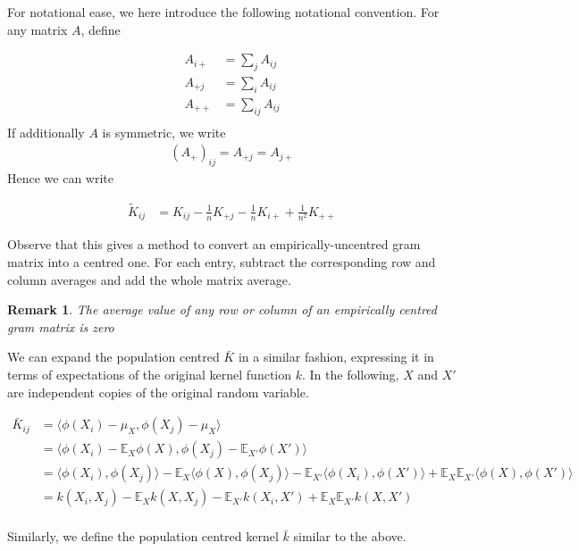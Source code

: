\documentclass[12pt]{article}
\newtheorem*{remark}{Remark}
\numberwithin{claim}{section}
\numberwithin{lemma}{section}
\numberwithin{theorem}{section}
\begin{document}
For notational ease, we here introduce the following notational convention. For any matrix $A$, define

\begin{align*}
A_{i+} & = \sum_j A_{ij} \\
A_{+j} & = \sum_i A_{ij} \\
A_{++} & = \sum_{ij} A_{ij} \\
\end{align*}
If additionally $A$ is symmetric, we write
\begin{align*}
(A_+)_{ij} = A_{+j} = A_{j+}
\end{align*}
Hence we can write

\begin{align*}
\tilde{K}_{ij}  & = K_{ij} -\frac{1}{n}  K_{+j} - \frac{1}{n}  K_{i+} + \frac{1}{n^2} K_{++}
\end{align*}

Observe that this gives a method to convert an empirically-uncentred gram matrix into a centred one. For each entry, subtract the corresponding row and column averages and add the whole matrix average.

\begin{remark}The average value of any row or column of an empirically centred gram matrix is zero
\end{remark}


We can expand the population centred $\bar{K}$ in a similar fashion, expressing it in terms of expectations of the original kernel function $k$. In the following, $X$ and $X'$ are independent copies of the original random variable.

\begin{align*}
\bar{K}_{ij}  & = \langle \phi(X_i) - \mu_X, \phi(X_j) - \mu_X \rangle \\
  & = \langle \phi(X_i) - \mathbb{E}_X\phi(X), \phi(X_j) -\mathbb{E}_{X'}\phi(X') \rangle \\
  & = \langle \phi(X_i), \phi(X_j) \rangle  -  \mathbb{E}_X \langle \phi(X), \phi(X_j) \rangle -  \mathbb{E}_{X'} \langle \phi(X_i) , \phi(X') \rangle +   \mathbb{E}_X \mathbb{E}_{X'} \langle \phi(X), \phi(X') \rangle \\
& = k(X_i,X_j)  -  \mathbb{E}_X k(X,X_j) -  \mathbb{E}_{X'} k(X_i,X') +   \mathbb{E}_X \mathbb{E}_{X'} k(X,X') \\
\end{align*}

Similarly, we define the population centred kernel $\bar{k}$ similar to the above.
\end{document}

